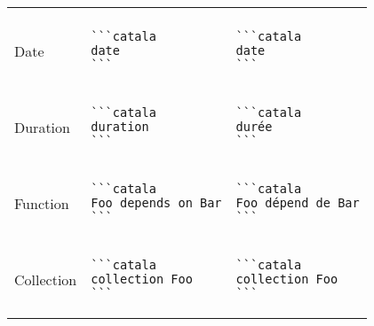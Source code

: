 \documentclass[a3paper,landscape]{article}
\begin{document}
\begin{multicols*}{2}
\begin{center}
\begin{tabular}{p{}p{}p{}}
\vspace*{-1.75em}
\\
Date&
\vspace*{-1.75em}
\begin{verbatim}
```catala
date
```
\end{verbatim}
\vspace*{-1.75em}
&
\vspace*{-1.75em}
\begin{verbatim}
```catala
date
```
\end{verbatim}
\vspace*{-1.75em}
\\
Duration&
\vspace*{-1.75em}
\begin{verbatim}
```catala
duration
```
\end{verbatim}
\vspace*{-1.75em}
&
\vspace*{-1.75em}
\begin{verbatim}
```catala
durée
```
\end{verbatim}
\vspace*{-1.75em}
\\
Function&
\vspace*{-1.75em}
\begin{verbatim}
```catala
Foo depends on Bar
```
\end{verbatim}
\vspace*{-1.75em}
&
\vspace*{-1.75em}
\begin{verbatim}
```catala
Foo dépend de Bar
```
\end{verbatim}
\vspace*{-1.75em}
\\
Collection&
\vspace*{-1.75em}
\begin{verbatim}
```catala
collection Foo
```
\end{verbatim}
\vspace*{-1.75em}
&
\vspace*{-1.75em}
\begin{verbatim}
```catala
collection Foo
```
\end{verbatim}
\vspace*{-1.75em}
\\
\bottomrule
\end{tabular}
\end{center}






\end{multicols*}
\end{document}
